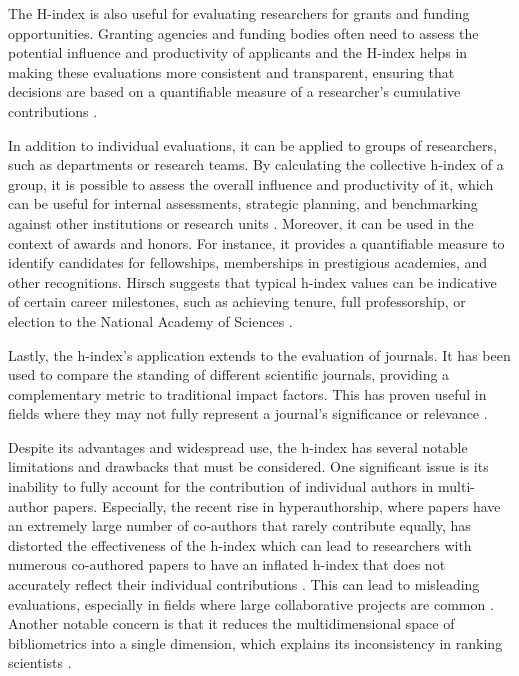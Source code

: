 The H-index is also useful for evaluating researchers for grants and funding
opportunities. Granting agencies and funding bodies often need to assess the
potential influence and productivity of applicants and the H-index helps in making
these evaluations more consistent and transparent, ensuring that decisions are
based on a quantifiable measure of a researcher's cumulative contributions
\cite{hirsch2005index,bornmann2007what,costas2007h,waltman2012inconsistency,hirsch2014meaning,koltun2021h}.

In addition to individual evaluations, it can be applied to groups of
researchers, such as departments or research teams. By calculating the
collective h-index of a group, it is possible to assess the overall influence
and productivity of it, which can be useful for internal assessments, strategic
planning, and benchmarking against other institutions or research units
\cite{hirsch2005index,bornmann2007what,costas2007h,waltman2012inconsistency,egghe2010hirsch,hirsch2014meaning,koltun2021h}.
Moreover, it can be used in the context of awards and honors. For instance, it
provides a quantifiable measure to identify candidates for fellowships,
memberships in prestigious academies, and other recognitions. Hirsch suggests
that typical h-index values can be indicative of certain career milestones,
such as achieving tenure, full professorship, or election to the National
Academy of Sciences
\cite{hirsch2005index,bornmann2007what,costas2007h,waltman2012inconsistency,egghe2010hirsch,hirsch2014meaning}.

Lastly, the h-index's application extends to the evaluation of journals. It has
been used to compare the standing of different scientific journals, providing a
complementary metric to traditional impact factors. This has proven useful in
fields where they may not fully represent a journal's significance
or relevance \cite{norris2010h}.

Despite its advantages and widespread use, the h-index has several notable
limitations and drawbacks that must be considered. One significant issue is its
inability to fully account for the contribution of individual authors in
multi-author papers. Especially, the recent rise in hyperauthorship, where
papers have an extremely large number of co-authors that rarely contribute
equally, has distorted the effectiveness of the h-index which can lead to
researchers with numerous co-authored papers to have an inflated h-index that
does not accurately reflect their individual contributions
\cite{koltun2021h,bihari2018h}. This can lead to misleading evaluations,
especially in fields where large collaborative projects are common
\cite{hirsch2005index,bornmann2007what,costas2007h,waltman2012inconsistency,norris2010h,egghe2010hirsch,hirsch2014meaning}.
Another notable concern is that it reduces the multidimensional space of
bibliometrics into a single dimension, which explains its inconsistency in
ranking scientists \cite{bornmann2007what}.


